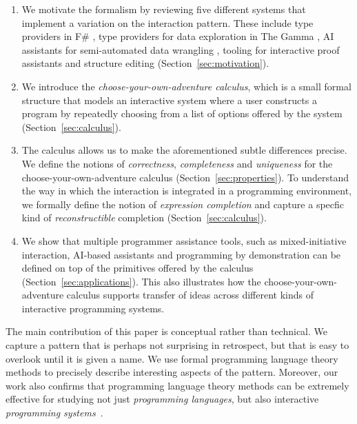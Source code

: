 \documentclass[ a4paper,UKenglish,cleveref, autoref, thm-restate]{lipics-v2021}
\begin{document}
\begin{enumerate}
\setlength{\itemsep}{5pt}
\item We motivate the formalism by reviewing five different systems that implement a variation on the
interaction pattern. These include type providers in F\# \cite{syme-2013-inforich},
type providers for data exploration in The Gamma \cite{petricek-2022-thegamma,petricek-2017-dotdriven},
AI assistants for semi-automated data wrangling \cite{petricek-2023-aias}, tooling for
interactive proof assistants \cite{altenkirch-1994-alf,brady-2015-idris,verter-2024-mixed}
and structure editing \cite{beckmann-2023-all} (Section~\ref{sec:motivation}).

\item We introduce the \emph{choose-your-own-adventure calculus}, which is a small formal structure
that models an interactive system where a user constructs a program by repeatedly choosing from a list
of options offered by the system (Section~\ref{sec:calculus}).

\item The calculus allows us to make the aforementioned subtle differences precise. We define the
notions of \emph{correctness}, \emph{completeness} and \emph{uniqueness} for the choose-your-own-adventure
calculus (Section~\ref{sec:properties}). To understand the way in which the interaction is
integrated in a programming environment, we formally define the notion of \emph{expression
completion} and capture a specfic kind of \emph{reconstructible} completion (Section~\ref{sec:calculus}).

\item We show that multiple programmer assistance tools, such as mixed-initiative interaction,
AI-based assistants and programming by demonstration can be defined on top of the primitives
offered by the calculus (Section~\ref{sec:applications}). This also illustrates how the
choose-your-own-adventure calculus supports transfer of ideas across different kinds of
interactive programming systems.
\end{enumerate}

The main contribution of this paper is conceptual rather than technical. We capture a
pattern that is perhaps not surprising in retrospect, but that is easy to overlook until it is
given a name. We use formal programming language theory methods to precisely describe
interesting aspects of the pattern. Moreover, our work also confirms that programming
language theory methods can be extremely effective for studying not just \emph{programming
languages}, but also interactive \emph{programming systems}~\cite{jakubovic-2023-techdims}.
\end{document}
